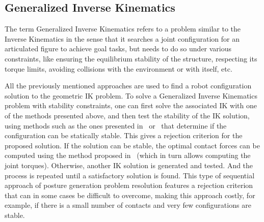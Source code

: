 \subsection{Generalized Inverse Kinematics}
\label{sub:generalized_inverse_kinematics}

The term Generalized Inverse Kinematics refers to a problem similar to the Inverse Kinematics in the sense that it searches a joint configuration for an articulated figure to achieve goal tasks, but needs to do so under various constraints, like ensuring the equilibrium stability of the structure, respecting its torque limits, avoiding collisions with the environment or with itself, etc.

All the previously mentioned approaches are used to find a robot configuration solution to the geometric IK problem.
To solve a Generalized Inverse Kinematics problem with stability constraints, one can first solve the associated IK with one of the methods presented above, and then test the stability of the IK solution, using methods such as the ones presented in~\cite{bretl:itro:2008} or~\cite{rimon2008general} that determine if the configuration can be statically stable.
This gives a rejection criterion for the proposed solution.
If the solution can be stable, the optimal contact forces can be computed using the method proposed in~\cite{boyd2007fast} (which in turn allows computing the joint torques).
Otherwise, another IK solution is generated and tested.
And the process is repeated until a satisfactory solution is found.
This type of sequential approach of posture generation problem resolution features a rejection criterion that can in some cases be difficult to overcome, making this approach costly, for example, if there is a small number of contacts and very few configurations are stable.



